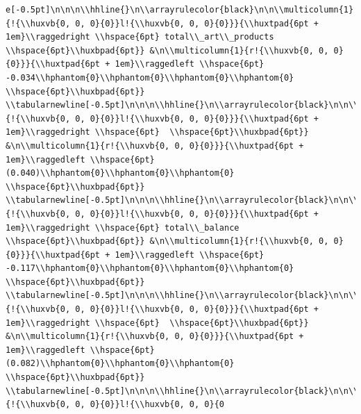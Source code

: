 \documentclass[11pt,preprint, authoryear]{elsarticle}
\numberwithin{equation}{section}
\numberwithin{figure}{section}
\numberwithin{table}{section}
\begin{document}
\begin{verbatim}
e[-0.5pt]\n\n\n\\hhline{}\n\\arrayrulecolor{black}\n\n\\multicolumn{1}{!{\\huxvb{0, 0, 0}{0}}l!{\\huxvb{0, 0, 0}{0}}}{\\huxtpad{6pt + 1em}\\raggedright \\hspace{6pt} total\\_art\\_products \\hspace{6pt}\\huxbpad{6pt}} &\n\\multicolumn{1}{r!{\\huxvb{0, 0, 0}{0}}}{\\huxtpad{6pt + 1em}\\raggedleft \\hspace{6pt} -0.034\\hphantom{0}\\hphantom{0}\\hphantom{0}\\hphantom{0} \\hspace{6pt}\\huxbpad{6pt}} \\tabularnewline[-0.5pt]\n\n\n\\hhline{}\n\\arrayrulecolor{black}\n\n\\multicolumn{1}{!{\\huxvb{0, 0, 0}{0}}l!{\\huxvb{0, 0, 0}{0}}}{\\huxtpad{6pt + 1em}\\raggedright \\hspace{6pt}  \\hspace{6pt}\\huxbpad{6pt}} &\n\\multicolumn{1}{r!{\\huxvb{0, 0, 0}{0}}}{\\huxtpad{6pt + 1em}\\raggedleft \\hspace{6pt} (0.040)\\hphantom{0}\\hphantom{0}\\hphantom{0} \\hspace{6pt}\\huxbpad{6pt}} \\tabularnewline[-0.5pt]\n\n\n\\hhline{}\n\\arrayrulecolor{black}\n\n\\multicolumn{1}{!{\\huxvb{0, 0, 0}{0}}l!{\\huxvb{0, 0, 0}{0}}}{\\huxtpad{6pt + 1em}\\raggedright \\hspace{6pt} total\\_balance \\hspace{6pt}\\huxbpad{6pt}} &\n\\multicolumn{1}{r!{\\huxvb{0, 0, 0}{0}}}{\\huxtpad{6pt + 1em}\\raggedleft \\hspace{6pt} -0.117\\hphantom{0}\\hphantom{0}\\hphantom{0}\\hphantom{0} \\hspace{6pt}\\huxbpad{6pt}} \\tabularnewline[-0.5pt]\n\n\n\\hhline{}\n\\arrayrulecolor{black}\n\n\\multicolumn{1}{!{\\huxvb{0, 0, 0}{0}}l!{\\huxvb{0, 0, 0}{0}}}{\\huxtpad{6pt + 1em}\\raggedright \\hspace{6pt}  \\hspace{6pt}\\huxbpad{6pt}} &\n\\multicolumn{1}{r!{\\huxvb{0, 0, 0}{0}}}{\\huxtpad{6pt + 1em}\\raggedleft \\hspace{6pt} (0.082)\\hphantom{0}\\hphantom{0}\\hphantom{0} \\hspace{6pt}\\huxbpad{6pt}} \\tabularnewline[-0.5pt]\n\n\n\\hhline{}\n\\arrayrulecolor{black}\n\n\\multicolumn{1}{!{\\huxvb{0, 0, 0}{0}}l!{\\huxvb{0, 0, 0}{0
\end{verbatim}
\end{document}
